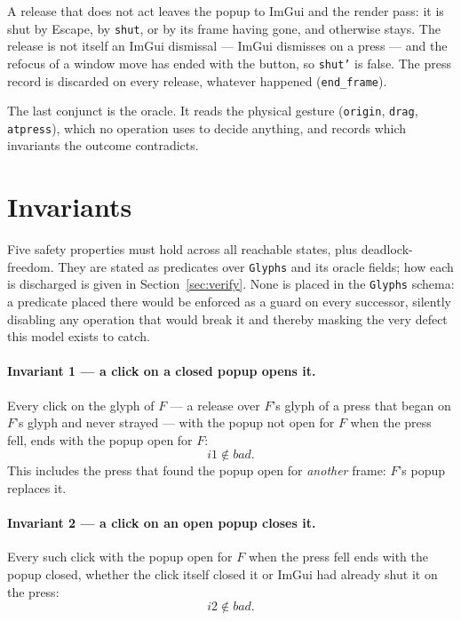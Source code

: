 \documentclass[a4paper,10pt,fleqn]{article}
\begin{document}
A release that does not act leaves the popup to ImGui and the render pass: it
is shut by Escape, by \texttt{shut}, or by its frame having gone, and otherwise
stays.  The release is not itself an ImGui dismissal --- ImGui dismisses on a
press --- and the refocus of a window move has ended with the button, so
\texttt{shut'} is false.  The press record is discarded on every release,
whatever happened (\texttt{end\_frame}).

The last conjunct is the oracle.  It reads the physical gesture
(\texttt{origin}, \texttt{drag}, \texttt{atpress}), which no operation uses to
decide anything, and records which invariants the outcome contradicts.

\section{Invariants}
\label{sec:inv}

Five safety properties must hold across all reachable states, plus
deadlock-freedom.  They are stated as predicates over \texttt{Glyphs} and its
oracle fields; how each is discharged is given in
Section~\ref{sec:verify}.  None is placed in the \texttt{Glyphs} schema: a
predicate placed there would be enforced as a guard on every successor, silently
disabling any operation that would break it and thereby masking the very defect
this model exists to catch.

\paragraph{Invariant 1 --- a click on a closed popup opens it.}
Every click on the glyph of $F$ --- a release over $F$'s glyph of a press that
began on $F$'s glyph and never strayed --- with the popup not open for $F$ when
the press fell, ends with the popup open for $F$:
\[
  i1 \notin bad.
\]
This includes the press that found the popup open for \emph{another} frame:
$F$'s popup replaces it.

\paragraph{Invariant 2 --- a click on an open popup closes it.}
Every such click with the popup open for $F$ when the press fell ends with the
popup closed, whether the click itself closed it or ImGui had already shut it on
the press:
\[
  i2 \notin bad.
\]
\end{document}
